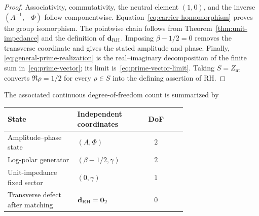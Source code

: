 \documentclass[11pt]{article}
\newcommand{\Znt}{Z_{\mathrm{nt}}}
\newcommand{\vzero}{\mathbf 0}
\begin{document}
\begin{proof}
Associativity, commutativity, the neutral element $(1,0)$, and the inverse
$(A^{-1},-\Phi)$ follow componentwise.  Equation~\eqref{eq:carrier-homomorphism} proves the
group isomorphism.  The pointwise chain follows from Theorem~\ref{thm:unit-impedance} and
the definition of $\mathbf d_{\rm RH}$.  Imposing $\beta-1/2=0$ removes the transverse
coordinate and gives the stated amplitude and phase.  Finally,
\eqref{eq:general-prime-realization} is the real--imaginary decomposition of the finite sum
in~\eqref{eq:prime-vector}; its limit is~\eqref{eq:prime-vector-limit}.  Taking
$S=\Znt$ converts $\Re\rho=1/2$ for every $\rho\in S$ into the defining assertion of RH.
\end{proof}

The associated continuous degree-of-freedom count is summarized by
\begin{center}
\begin{tabular}{>{\raggedright\arraybackslash}p{0.39\linewidth}>{\raggedright\arraybackslash}p{0.31\linewidth}c}
\toprule
State & Independent coordinates & DoF\\
\midrule
Amplitude--phase state & $(A,\Phi)$ & $2$\\
Log-polar generator & $(\beta-1/2,\gamma)$ & $2$\\
Unit-impedance fixed sector & $(0,\gamma)$ & $1$\\
Transverse defect after matching & $\mathbf d_{\rm RH}=\vzero_2$ & $0$\\
\bottomrule
\end{tabular}
\end{center}
\end{document}
